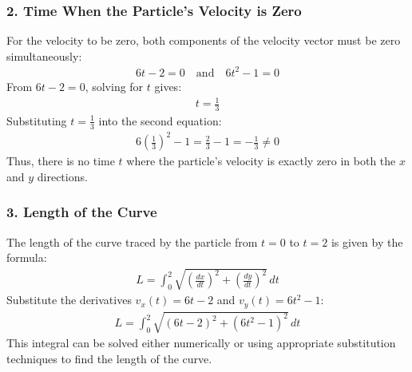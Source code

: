 \documentclass[letterpaper,10pt,english]{jupyterBook}
\begin{document}
\subsubsection{2. Time When the Particle’s Velocity is Zero}
\label{\detokenize{prerequisites:time-when-the-particle-s-velocity-is-zero}}
\sphinxAtStartPar
For the velocity to be zero, both components of the velocity vector must be zero simultaneously:
\begin{equation*}
\begin{split}
  6t - 2 = 0 \quad \text{and} \quad 6t^2 - 1 = 0
  \end{split}
\end{equation*}
\sphinxAtStartPar
From \(6t - 2 = 0\), solving for \(t\) gives:
\begin{equation*}
\begin{split}
  t = \frac{1}{3}
  \end{split}
\end{equation*}
\sphinxAtStartPar
Substituting \(t = \frac{1}{3}\) into the second equation:
\begin{equation*}
\begin{split}
  6 \left(\frac{1}{3}\right)^2 - 1 = \frac{2}{3} - 1 = -\frac{1}{3} \neq 0
  \end{split}
\end{equation*}
\sphinxAtStartPar
Thus, there is no time \(t\) where the particle’s velocity is exactly zero in both the \(x\) and \(y\) directions.


\subsubsection{3. Length of the Curve}
\label{\detokenize{prerequisites:length-of-the-curve}}
\sphinxAtStartPar
The length of the curve traced by the particle from \(t = 0\) to \(t = 2\) is given by the formula:
\begin{equation*}
\begin{split}
  L = \int_0^2 \sqrt{\left(\frac{dx}{dt}\right)^2 + \left(\frac{dy}{dt}\right)^2} \, dt
  \end{split}
\end{equation*}
\sphinxAtStartPar
Substitute the derivatives \(v_x(t) = 6t - 2\) and \(v_y(t) = 6t^2 - 1\):
\begin{equation*}
\begin{split}
  L = \int_0^2 \sqrt{(6t - 2)^2 + (6t^2 - 1)^2} \, dt
  \end{split}
\end{equation*}
\sphinxAtStartPar
This integral can be solved either numerically or using appropriate substitution techniques to find the length of the curve.
\end{document}

